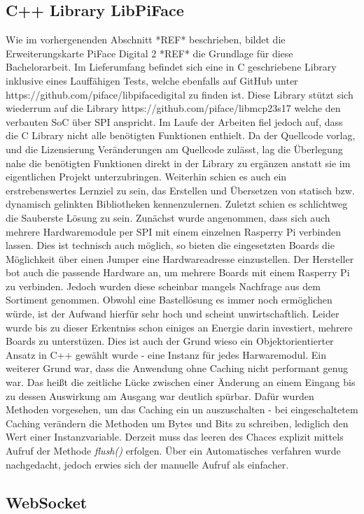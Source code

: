 \subsection{C++ Library LibPiFace}
Wie im vorhergenenden Abschnitt *REF* beschrieben, bildet die Erweiterungskarte PiFace Digital 2 *REF* die Grundlage für diese Bachelorarbeit. Im Lieferumfang befindet sich eine in C geschriebene Library inklusive eines Lauffähigen Tests, welche ebenfalls auf GitHub unter https://github.com/piface/libpifacedigital zu finden ist. Diese Library stützt sich wiederrum auf die Library https://github.com/piface/libmcp23s17 welche den verbauten SoC über SPI anspricht. Im Laufe der Arbeiten fiel jedoch auf, dass die C Library nicht alle benötigten Funktionen enthielt. Da der Quellcode vorlag, und die Lizensierung Veränderungen am Quellcode zulässt, lag die Überlegung nahe die benötigten Funktionen direkt in der Library zu ergänzen anstatt sie im eigentlichen Projekt unterzubringen. Weiterhin schien es auch ein erstrebenswertes Lernziel zu sein, das Erstellen und Übersetzen von statisch bzw. dynamisch gelinkten Bibliotheken kennenzulernen. Zuletzt schien es schlichtweg die Sauberste Lösung zu sein. Zunächst wurde angenommen, dass sich auch mehrere Hardwaremodule per SPI mit einem einzelnen Rasperry Pi verbinden lassen. Dies ist technisch auch möglich, so bieten die eingesetzten Boards die Möglichkeit über einen Jumper eine Hardwareadresse einzustellen. Der Hersteller bot auch die passende Hardware an, um mehrere Boards mit einem Rasperry Pi zu verbinden. Jedoch wurden diese scheinbar mangels Nachfrage aus dem Sortiment genommen. Obwohl eine Bastellösung es immer noch ermöglichen würde, ist der Aufwand hierfür sehr hoch und scheint unwirtschaftlich. Leider wurde bis zu dieser Erkentniss schon einiges an Energie darin investiert, mehrere Boards zu unterstüzen. Dies ist auch der Grund wieso ein Objektorientierter Ansatz in C++ gewählt wurde - eine Instanz für jedes Harwaremodul. Ein weiterer Grund war, dass die Anwendung ohne Caching nicht performant genug war. Das heißt die zeitliche Lücke zwischen einer Änderung an einem Eingang bis zu dessen Auswirkung am Ausgang war deutlich spürbar. Dafür wurden Methoden vorgesehen, um das Caching ein un auszuschalten - bei eingeschaltetem Caching verändern die Methoden um Bytes und Bits zu schreiben, lediglich den Wert einer Instanzvariable. Derzeit muss das leeren des Chaces explizit mittels Aufruf der Methode \textit{flush()} erfolgen. Über ein Automatisches verfahren wurde nachgedacht, jedoch erwies sich der manuelle Aufruf als einfacher. 

\subsection{WebSocket} \label{chp:grdlgn:webSocket}
    
\clearpage
